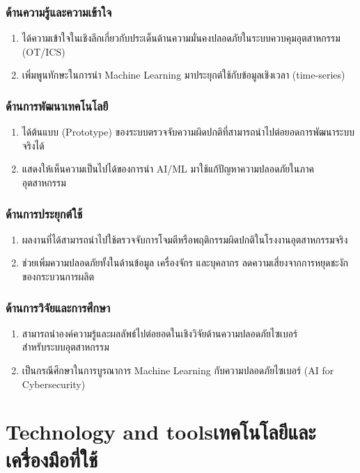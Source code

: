 \subsubsection{ด้านความรู้และความเข้าใจ}
\begin{enumerate}
    \item ได้ความเข้าใจในเชิงลึกเกี่ยวกับประเด็นด้านความมั่นคงปลอดภัยในระบบควบคุมอุตสาหกรรม (OT/ICS)
    \item เพิ่มพูนทักษะในการนำ Machine Learning มาประยุกต์ใช้กับข้อมูลเชิงเวลา (time-series)
\end{enumerate}

\subsubsection{ด้านการพัฒนาเทคโนโลยี}
\begin{enumerate}
    \item ได้ต้นแบบ (Prototype) ของระบบตรวจจับความผิดปกติที่สามารถนำไปต่อยอดการพัฒนาระบบจริงได้
    \item แสดงให้เห็นความเป็นไปได้ของการนำ AI/ML มาใช้แก้ปัญหาความปลอดภัยในภาคอุตสาหกรรม
\end{enumerate}

\subsubsection{ด้านการประยุกต์ใช้}
\begin{enumerate}
    \item ผลงานที่ได้สามารถนำไปใช้ตรวจจับการโจมตีหรือพฤติกรรมผิดปกติในโรงงานอุตสาหกรรมจริง
    \item ช่วยเพิ่มความปลอดภัยทั้งในด้านข้อมูล เครื่องจักร และบุคลากร ลดความเสี่ยงจากการหยุดชะงักของกระบวนการผลิต
\end{enumerate}

\subsubsection{ด้านการวิจัยและการศึกษา}
\begin{enumerate}
    \item สามารถนำองค์ความรู้และผลลัพธ์ไปต่อยอดในเชิงวิจัยด้านความปลอดภัยไซเบอร์ \\ สำหรับระบบอุตสาหกรรม
    \item เป็นกรณีศึกษาในการบูรณาการ Machine Learning กับความปลอดภัยไซเบอร์ (AI for Cybersecurity)
\end{enumerate}

\section{\ifenglish Technology and tools\else เทคโนโลยีและเครื่องมือที่ใช้\fi}

